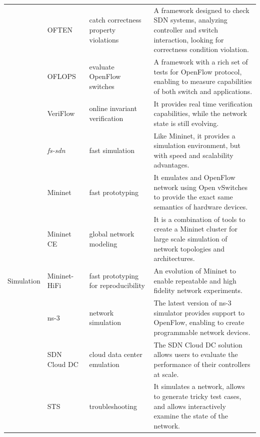 {\begin{table}[!htp]
\begin{center}
\begin{tabularx}{\linewidth}{p{1.2cm}p{2.5cm}p{3.5cm}X}
& OFTEN~\cite{kuzniar2012} & catch correctness property violations & A framework designed to check SDN systems, analyzing controller and switch interaction, looking for correctness condition violation. \\
 & OFLOPS~\cite{rotsos2012-1} & evaluate OpenFlow switches & A framework with a rich set of tests for OpenFlow protocol, enabling to measure capabilities of both switch and applications. \\
& VeriFlow~\cite{khurshid2012} & online invariant verification & It provides real time verification capabilities, while the network state is still evolving. \\
\hline
\multirow{12}{*}{Simulation} 
& \textit{fs-sdn}~\cite{gupta2013} & fast simulation & Like Mininet, it provides a simulation environment, but with speed and scalability advantages.\\
& Mininet~\cite{lantz2010} & fast prototyping & It emulates and OpenFlow network using Open vSwitches to provide the exact same semantics of hardware devices. \\
& Mininet CE~\cite{antonenko2013} & global network modeling & It is a combination of tools to create a Mininet cluster for large scale simulation of network topologies and architectures.\\
& Mininet-HiFi~\cite{handigol2012} & fast prototyping for reproducibility & An evolution of Mininet to enable repeatable and high fidelity network experiments. \\
& ns-3~\cite{ns3project2013} & network simulation & The latest version of ns-3 simulator provides support to OpenFlow, enabling to create programmable network devices. \\
& SDN Cloud DC~\cite{teixeira2013} & cloud data center emulation & The SDN Cloud DC solution allows users to evaluate the performance of their controllers at scale.\\
& STS~\cite{ucbsts2013} & troubleshooting & It simulates a network, allows to generate tricky test cases, and allows interactively examine the state of the network.\\
\hline
\end{tabularx}
\end{center}
\end{table}
}
